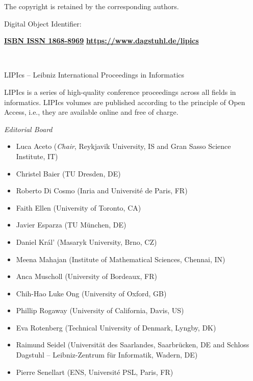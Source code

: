 \documentclass[a4paper,UKenglish]{lipicsmaster-v2021}
\begin{document}
\begin{publicationinfo}
\smallskip

The copyright is retained by the corresponding authors.

\bigskip
\bigskip
\bigskip
\bigskip

Digital Object Identifier: \href{https://doi.org/\printDOI}{\printDOI}

\vfill
\textbf{\href{https://www.dagstuhl.de/dagpub/\printISBN}{ISBN \printISBN}}\qquad \qquad \textbf{\href{https://www.dagstuhl.de/dagpub/1868-8969}{ISSN 1868-8969}}  \hfill \textbf{\href{https://www.dagstuhl.de/lipics}{https://www.dagstuhl.de/lipics}}


\newpage

\ \\
\bigskip
\bigskip
\bigskip

{\Large LIPIcs -- Leibniz International Proceedings in Informatics}

\bigskip

LIPIcs is a series of high-quality conference proceedings across all fields in informatics. 
LIPIcs volumes are published according to the principle of Open Access, i.e., they are available online and free of charge. 

\bigskip
\bigskip
\bigskip

\emph{Editorial Board}

\begin{itemize} 
\item Luca Aceto (\emph{Chair}, Reykjavik University, IS and Gran Sasso Science Institute, IT)
\item Christel Baier (TU Dresden, DE)
\item Roberto Di Cosmo (Inria and Universit\'e de Paris, FR)
\item Faith Ellen (University of Toronto, CA)
\item Javier Esparza (TU M\"unchen, DE)
\item Daniel Kr\'al' (Masaryk University, Brno, CZ)
\item Meena Mahajan (Institute of Mathematical Sciences, Chennai, IN)
\item Anca Muscholl (University of Bordeaux, FR)
\item Chih-Hao Luke Ong (University of Oxford, GB)
\item Phillip Rogaway (University of California, Davis, US)
\item Eva Rotenberg (Technical University of Denmark, Lyngby, DK)
\item Raimund Seidel  (Universit\"at des Saarlandes, Saarbr\"ucken, DE and Schloss Dagstuhl -- Leibniz-Zentrum f\"ur Informatik, Wadern, DE)
\item Pierre Senellart (ENS, Universit\'{e} PSL, Paris, FR)
\end{itemize}



\end{publicationinfo}
\end{document}
